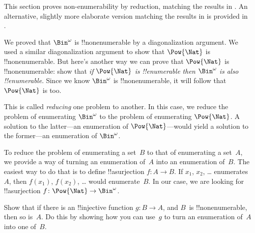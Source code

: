 \documentclass[../../../include/open-logic-section]{subfiles}
\begin{document}

\begin{editorial}
  This section proves non-enumerability by reduction, matching the
  results in . An alternative, slightly more
  elaborate version matching the results in  is
  provided in .
\end{editorial}

We proved that $\Bin^\omega$ is !!{nonenumerable} by a diagonalization
argument. We used a similar diagonalization argument to show that
$\Pow{\Nat}$ is !!{nonenumerable}. But here's another way we can prove
that $\Pow{\Nat}$ is !!{nonenumerable}: show that \emph{if
$\Pow{\Nat}$ is !!{enumerable} then $\Bin^\omega$ is also
!!{enumerable}}.  Since we know $\Bin^\omega$ is !!{nonenumerable}, it
will follow that $\Pow{\Nat}$ is too.  

This is called \emph{reducing} one problem to another. In this case,
we reduce the problem of enumerating $\Bin^\omega$ to the problem of
enumerating $\Pow{\Nat}$.  A solution to the latter---an enumeration
of $\Pow{\Nat}$---would yield a solution to the former---an
enumeration of $\Bin^\omega$.

To reduce the problem of enumerating a set~$B$ to that of enumerating
a set~$A$, we provide a way of turning an enumeration of~$A$ into an
enumeration of~$B$.  The easiest way to do that is to define
!!a{surjection} $f\colon A \to B$.  If $x_1$, $x_2$, \dots{}
enumerates~$A$, then $f(x_1)$, $f(x_2)$, \dots{} would enumerate~$B$.
In our case, we are looking for !!a{surjection} $f\colon \Pow{\Nat}
\to \Bin^\omega$.

\begin{prob}
Show that if there is an !!{injective} function $g\colon B \to A$, and
$B$~is !!{nonenumerable}, then so is~$A$. Do this by showing how you
can use~$g$ to turn an enumeration of~$A$ into one of~$B$.
\end{prob}
\end{document}
